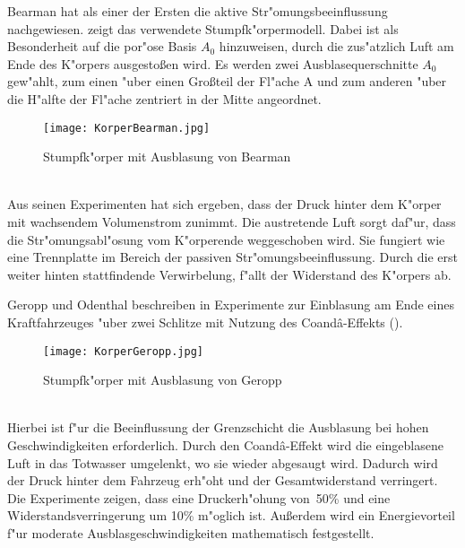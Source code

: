 Bearman \cite{Hucho.2011} hat als einer der Ersten die aktive Str"omungsbeeinflussung nachgewiesen.  zeigt das verwendete Stumpfk"orpermodell. Dabei ist als Besonderheit auf die por"ose Basis \(A_{0}\) hinzuweisen, durch die zus"atzlich Luft am Ende des K"orpers ausgesto\ss{}en wird. Es werden zwei Ausblasequerschnitte \(A_{0}\) gew"ahlt, zum einen "uber einen Gro\ss{}teil der Fl"ache A und zum anderen "uber die H"alfte der Fl"ache zentriert in der Mitte angeordnet.
\begin{figure}[h]
	\centering
	\texttt{[image: KorperBearman.jpg]}
	\caption{Stumpfk"orper mit Ausblasung von Bearman \cite{Hucho.2011}}
	\label{fig:Bearman}
\end{figure}\\
Aus seinen Experimenten \cite{Hucho.2011} hat sich ergeben, dass der Druck hinter dem K"orper mit wachsendem Volumenstrom zunimmt. Die austretende Luft sorgt daf"ur, dass die Str"omungsabl"osung vom K"orperende weggeschoben wird. Sie fungiert wie eine Trennplatte im Bereich der passiven Str"omungsbeeinflussung. Durch die erst weiter hinten stattfindende Verwirbelung, f"allt der Widerstand des K"orpers ab.

Geropp und Odenthal beschreiben in \cite{Geropp.2000} Experimente zur Einblasung am Ende eines Kraftfahrzeuges "uber zwei Schlitze mit Nutzung des Coand\^{a}-Effekts ().
\begin{figure}[h]
	\centering
	\texttt{[image: KorperGeropp.jpg]}
	\caption{Stumpfk"orper mit Ausblasung von Geropp \cite{Geropp.2000}}
	\label{fig:Geropp}
\end{figure}\\
Hierbei ist f"ur die Beeinflussung der Grenzschicht die Ausblasung bei hohen Geschwindigkeiten erforderlich. Durch den Coand\^{a}-Effekt wird die eingeblasene Luft in das Totwasser umgelenkt, wo sie wieder abgesaugt wird. Dadurch wird der Druck hinter dem Fahrzeug erh"oht und der Gesamtwiderstand verringert. Die Experimente zeigen, dass eine Druckerh"ohung von~50\% und eine Widerstandsverringerung um 10\% m"oglich ist. Au\ss{}erdem wird ein Energievorteil f"ur moderate Ausblasgeschwindigkeiten mathematisch festgestellt.

